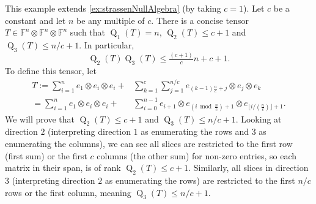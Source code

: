 \documentclass{daj}
\DeclareMathOperator{\subrank}{Q}
\newcommand{\FF}{\mathbb{F}}
\begin{document}
\begin{example}%
    \label{ex:generalisedNullAlg}
    This example extends \autoref{ex:strassenNullAlgebra} (by taking $c=1$).
    Let $c$ be a constant and let $n$  be any multiple of $c$.
    There is a concise tensor $T \in \FF^{n} \otimes \FF^n \otimes \FF^n$ such that
    $\subrank_1(T)=n$, $\subrank_2(T)\leq c+1$ and $\subrank_3(T)\leq n/c+1$.
    In particular,
    \[
    \subrank_2(T)\subrank_3(T)\leq  \tfrac{(c+1)}{c} n+c+1.
    \]
    To define this tensor, let
    \begin{align*}
    T:=\sum_{i=1}^n e_1\otimes e_i\otimes e_i+&\sum_{k=1}^{c}\sum_{j=1}^{n/c}e_{(k-1)\frac{n}{c}+j}\otimes e_j\otimes e_k\\
    =\sum_{i=1}^n e_1\otimes e_i\otimes e_i+&\sum_{i=0}^{n-1} e_{i+1}\otimes e_{(i \bmod \frac{n}{c}) + 1}\otimes e_{\lfloor i / (\frac{n}{c})\rfloor+1}.
    \end{align*}
    We will prove that $\subrank_2(T)\leq c+1$ and $\subrank_3(T)\leq n/c+1$.
    Looking at direction $2$ (interpreting direction $1$ as enumerating the rows and $3$ as enumerating the columns), we can see all slices are restricted to the first row (first sum) or the first $c$ columns (the other sum) 
    for non-zero entries, so each matrix in their span, is of rank $\subrank_2(T)\leq c+1$. 
    Similarly, all slices in direction $3$ (interpreting direction $2$ as enumerating the rows) are restricted to the first $n/c$ rows or the first column, meaning $\subrank_3(T)\leq n/c+1$.
     

\end{example}

%
%
%
%
%
%
%

%

%

%
%
%

%

%
%
\end{document}
